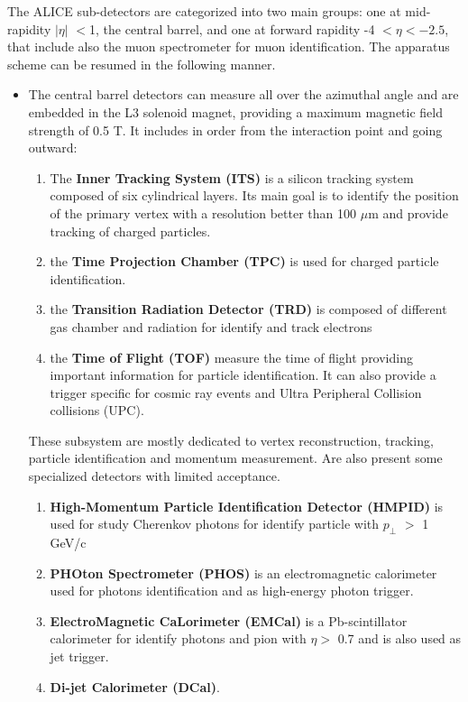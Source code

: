 \documentclass[12pt,a4paper]{book}
\begin{document}
	The ALICE sub-detectors are categorized into two main groups: one at mid-rapidity $|\eta|$ $<$1, the central barrel, and one at forward rapidity -4 $< \eta < -2.5$, that include also the muon spectrometer for muon identification. The apparatus scheme can be resumed in the following manner.
	\begin{itemize}
		\item The central barrel detectors can measure all over the azimuthal angle and are embedded in the L3 solenoid magnet, providing a maximum magnetic field strength of 0.5 T. It includes in order from the interaction point and going outward:
		\begin{enumerate}
			\item The \textbf{Inner Tracking System (ITS)} is a silicon tracking system composed of six cylindrical layers. Its main goal is to identify the	position of the primary vertex with a resolution better than 100 $\mu$m and provide tracking of charged particles.
			\item  the\textbf{ Time Projection Chamber (TPC)} is used for charged particle identification.
			\item the \textbf{Transition Radiation Detector (TRD)} is composed of different gas chamber and radiation for identify and track electrons
			\item the \textbf{Time of Flight (TOF)} measure the time of flight providing important information for particle identification. It can also provide a trigger specific for cosmic ray events and Ultra Peripheral Collision collisions (UPC).
		\end{enumerate}
		These subsystem are mostly dedicated to vertex reconstruction, tracking, particle identification and momentum measurement. Are also present some specialized detectors with limited acceptance. 
		\begin{enumerate}
			\item \textbf{High-Momentum Particle Identification Detector (HMPID)} is used for study Cherenkov photons for identify particle with $p_\perp$ $>$ 1 GeV/c
			\item \textbf{PHOton Spectrometer (PHOS)} is an electromagnetic calorimeter used for photons identification and as high-energy photon trigger.
			\item \textbf{ElectroMagnetic CaLorimeter (EMCal)} is a Pb-scintillator calorimeter for identify photons and pion with $\eta >$ 0.7 and is also used as jet trigger.
			\item  \textbf{Di-jet Calorimeter (DCal)}.
		\end{enumerate}

\end{itemize}
\end{document}
